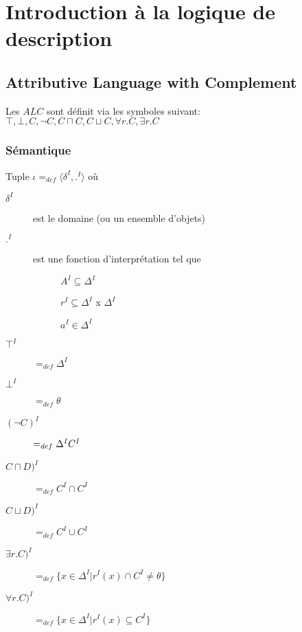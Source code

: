 \chapter{Introduction à la logique de description}
\section{Attributive Language with Complement}

Les $ALC$ sont définit via les symboles suivant:\\
$\top, \bot, C, \neg C, C \sqcap C, C \sqcup C, \forall r.C, \exists r.C$\\

\subsection{Sémantique}
Tuple $\iota =_{def} \langle \delta^I, .^I \rangle$ où
\begin{description}
\item[$\delta^I$] est le domaine (ou un ensemble d'objets)
\item[$.^I$] est une fonction d'interprétation tel que 
\begin{description}
\item[] $A^I \subseteq \Delta^I$
\item[] $r^I \subseteq \Delta^I$ x $ \Delta^I$
\item[] $a^I \in \Delta^I$
\end{description}
\item[$\top^I$] $=_{def} \Delta^I$
\item[$\bot^I$] $=_{def} \theta$
\item[$(\neg C)^I$] $=_{def} \Delta^I \\ C^I$
\item[$C \sqcap D)^I$] $=_{def} C^I \cap C^I$
\item[$C \sqcup D)^I$] $=_{def} C^I \cup C^I$
\item[$\exists r.C)^I$] $=_{def} \{ x \in \Delta^I | r^I(x) \cap C^I \neq \theta \}$
\item[$\forall r.C)^I$] $=_{def} \{ x \in \Delta^I | r^I(x) \subseteq C^I \}$
\end{description}

